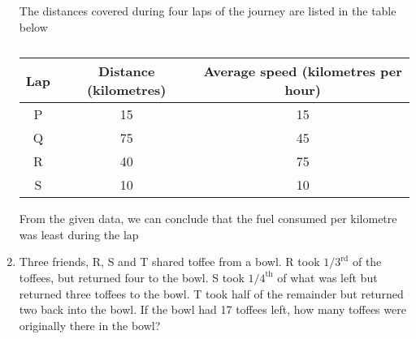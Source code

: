 \documentclass[a4paper, 11pt]{article}
\begin{document}
\begin{enumerate}
    The distances covered during four laps of the journey are listed in the table below
    
    \begin{table}[H]
        \centering
        \begin{tabular}{|c|c|c|}
            \hline
            \textbf{Lap} & \textbf{Distance (kilometres)} & \textbf{Average speed (kilometres per hour)} \\
            \hline
            P & 15 & 15 \\
            Q & 75 & 45 \\
            R & 40 & 75 \\
            S & 10 & 10 \\
            \hline
        \end{tabular}
        \caption*{}
        \label{tab:q62}
    \end{table}
    
    From the given data, we can conclude that the fuel consumed per kilometre was least during the lap
    
    \begin{enumerate}
    \end{enumerate}

    \hfill{}

    \item Three friends, R, S and T shared toffee from a bowl. R took $1/3^{\text{rd}}$ of the toffees, but returned four to the bowl. S took $1/4^{\text{th}}$ of what was left but returned three toffees to the bowl. T took half of the remainder but returned two back into the bowl. If the bowl had 17 toffees left, how many toffees were originally there in the bowl?
    
    \begin{enumerate}
    \end{enumerate}
    

\end{enumerate}
\end{document}
